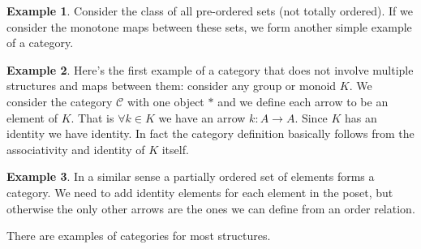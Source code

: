 \documentclass[12pt]{article}
\theoremstyle{plain}
\theoremstyle{definition}
\newtheorem{example}{Example}
\newcommand{\Cc}{\mathcal{C}}
\begin{document}
\begin{example}
Consider the class of all pre-ordered sets (not totally ordered). If we consider the monotone maps between these sets, we form another simple example of a category.
\end{example}

\begin{example}
Here's the first example of a category that does not involve multiple structures and maps between them: consider any group or monoid $K$. We consider the category $\Cc$ with one object $\ast$ and we define each arrow to be an element of $K$. That is $\forall k \in K$ we have an arrow $k: A \to A$. Since $K$ has an identity we have identity. In fact the category definition basically follows from the associativity and identity of $K$ itself.
\end{example}

\begin{example}
In a similar sense a partially ordered set of elements forms a category. We need to add identity elements for each element in the poset, but otherwise the only other arrows are the ones we can define from an order relation.
\end{example}

There are examples of categories for most structures.
\end{document}
